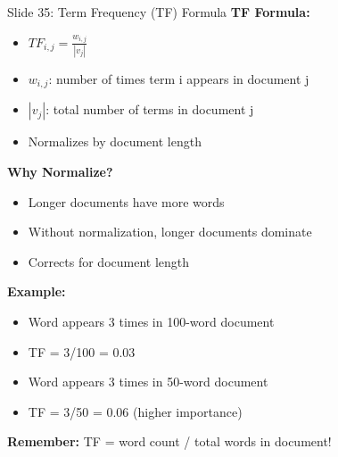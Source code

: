 \documentclass[8pt]{beamer}
\begin{document}
	\begin{frame}{Slide 35: Term Frequency (TF) Formula}
		\fontsize{6.5}{7.5}\selectfont
		\textbf{TF Formula:}
		\begin{itemize}
			\item $TF_{i,j} = \frac{w_{i,j}}{|v_j|}$
			\item $w_{i,j}$: number of times term i appears in document j
			\item $|v_j|$: total number of terms in document j
			\item Normalizes by document length
		\end{itemize}
		
		\vspace{0.1cm}
		\textbf{Why Normalize?}
		\begin{itemize}
			\item Longer documents have more words
			\item Without normalization, longer documents dominate
			\item Corrects for document length
		\end{itemize}
		
		\vspace{0.1cm}
		\textbf{Example:}
		\begin{itemize}
			\item Word appears 3 times in 100-word document
			\item TF = 3/100 = 0.03
			\item Word appears 3 times in 50-word document
			\item TF = 3/50 = 0.06 (higher importance)
		\end{itemize}
		
		\textcolor{myblue}{\textbf{Remember:}} TF = word count / total words in document!
	\end{frame}
	
\end{document}

